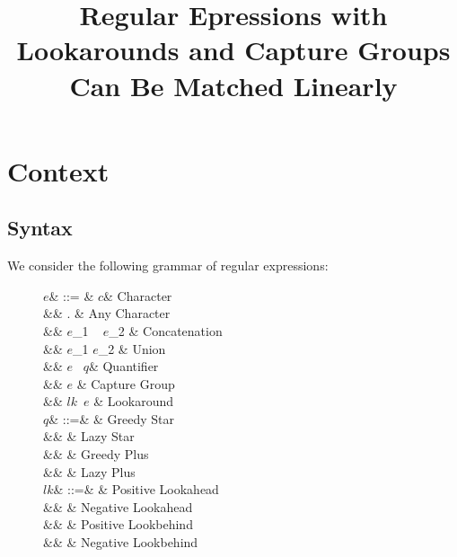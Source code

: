 \documentclass{article}
\title{Regular Epressions with Lookarounds and Capture Groups Can Be Matched Linearly}
\author{}
\date{}
\def\regex#1{\lstinline[style=rgx]{#1}}
\def\tregex#1{\text{\regex{#1}}}
\begin{document}
\maketitle


\section{Context}

\subsection{Syntax}
We consider the following grammar of regular expressions:

\def\re{\ensuremath{\mathit{e}}}
\def\char{\ensuremath{\mathit{c}}}
\def\quant{\ensuremath{\mathit{q}}}
\def\look{\ensuremath{\mathit{lk}}}

\begin{figure}[h]
  \begin{syntax}
\re & ::= & \char & Character \\
&\mid& . & Any Character\\
&\mid& \re_1 ~ \re_2 & Concatenation\\
&\mid& \re_1 \tregex{|} \re_2 & Union\\
&\mid&  \re ~ \quant & Quantifier \\
&\mid&  \tregex{(}\re\tregex{)} & Capture Group \\
&\mid& \tregex{(}\look~\re\tregex{)} & Lookaround \\
%
\quant & ::=& \tregex{*} & Greedy Star\\
&\mid& \tregex{*?} & Lazy Star\\
&\mid& \tregex{+} & Greedy Plus\\
&\mid& \tregex{+?} & Lazy Plus\\
%
\look & ::=& \tregex{?=} & Positive Lookahead\\
&\mid& \tregex{?!} & Negative Lookahead\\
&\mid& \tregex{?<=} & Positive Lookbehind\\
&\mid& \tregex{?<!} & Negative Lookbehind\\
  \end{syntax}
\end{figure}
\end{document}
